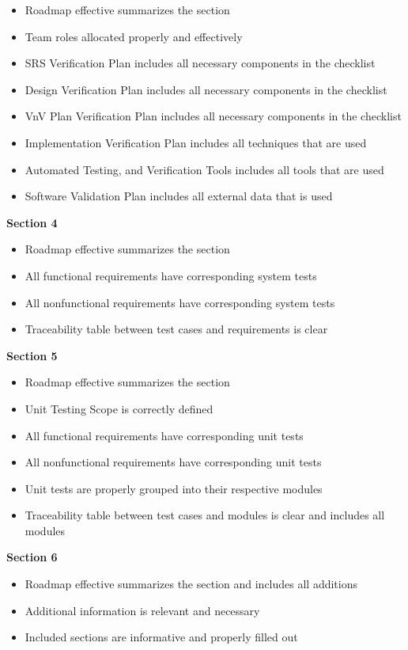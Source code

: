 \documentclass[12pt, titlepage]{article}
\begin{document}
\begin{itemize}
  \item Roadmap effective summarizes the section
  \item Team roles allocated properly and effectively
  \item SRS Verification Plan includes all necessary components in the checklist
  \item Design Verification Plan includes all necessary components in the checklist
  \item VnV Plan Verification Plan includes all necessary components in the checklist
  \item Implementation Verification Plan includes all techniques that are used
  \item Automated Testing, and Verification Tools includes all tools that are used
  \item Software Validation Plan includes all external data that is used
\end{itemize}
\noindent
\textbf{Section 4}
\begin{itemize}
  \item Roadmap effective summarizes the section
  \item All functional requirements have corresponding system tests
  \item All nonfunctional requirements have corresponding system tests
  \item Traceability table between test cases and requirements is clear
\end{itemize}
\noindent
\textbf{Section 5}
\begin{itemize}
  \item Roadmap effective summarizes the section
  \item Unit Testing Scope is correctly defined
  \item All functional requirements have corresponding unit tests
  \item All nonfunctional requirements have corresponding unit tests
  \item Unit tests are properly grouped into their respective modules
  \item Traceability table between test cases and modules is clear and includes all modules
\end{itemize}
\noindent
\textbf{Section 6}
\begin{itemize}
  \item Roadmap effective summarizes the section and includes all additions
  \item Additional information is relevant and necessary
  \item Included sections are informative and properly filled out
\end{itemize}
\end{document}
